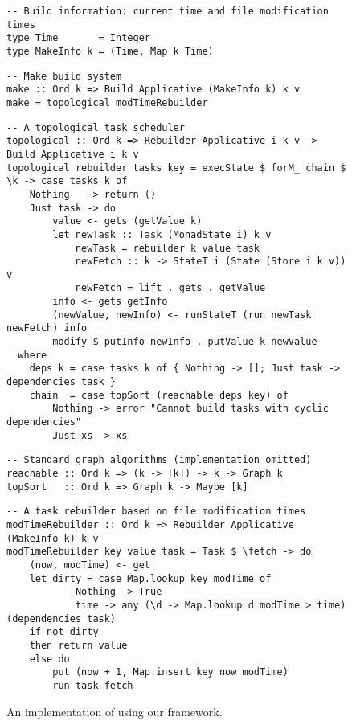 \begin{figure}
\begin{verbatim}
-- Build information: current time and file modification times
type Time       = Integer
type MakeInfo k = (Time, Map k Time)
\end{verbatim}
\vspace{1mm}
\begin{verbatim}
-- Make build system
make :: Ord k => Build Applicative (MakeInfo k) k v
make = topological modTimeRebuilder
\end{verbatim}
\vspace{1mm}
\begin{verbatim}
-- A topological task scheduler
topological :: Ord k => Rebuilder Applicative i k v -> Build Applicative i k v
topological rebuilder tasks key = execState $ forM_ chain $ \k -> case tasks k of
    Nothing   -> return ()
    Just task -> do
        value <- gets (getValue k)
        let newTask :: Task (MonadState i) k v
            newTask = rebuilder k value task
            newFetch :: k -> StateT i (State (Store i k v)) v
            newFetch = lift . gets . getValue
        info <- gets getInfo
        (newValue, newInfo) <- runStateT (run newTask newFetch) info
        modify $ putInfo newInfo . putValue k newValue
  where
    deps k = case tasks k of { Nothing -> []; Just task -> dependencies task }
    chain  = case topSort (reachable deps key) of
        Nothing -> error "Cannot build tasks with cyclic dependencies"
        Just xs -> xs
\end{verbatim}
\vspace{1mm}
\begin{verbatim}
-- Standard graph algorithms (implementation omitted)
reachable :: Ord k => (k -> [k]) -> k -> Graph k
topSort   :: Ord k => Graph k -> Maybe [k]
\end{verbatim}
\vspace{1mm}
\begin{verbatim}
-- A task rebuilder based on file modification times
modTimeRebuilder :: Ord k => Rebuilder Applicative (MakeInfo k) k v
modTimeRebuilder key value task = Task $ \fetch -> do
    (now, modTime) <- get
    let dirty = case Map.lookup key modTime of
            Nothing -> True
            time -> any (\d -> Map.lookup d modTime > time) (dependencies task)
    if not dirty
    then return value
    else do
        put (now + 1, Map.insert key now modTime)
        run task fetch
\end{verbatim}
\vspace{-2mm}
\caption{An implementation of \Make using our framework.}\label{fig-make-implementation}
\vspace{-2mm}
\end{figure}

